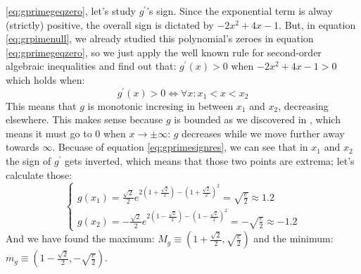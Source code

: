 \ref{eq:gprimegeqzero}, let's study $g^\prime$'s sign.
Since the exponential term is alway (strictly) positive, the overall sign is dictated
by $-2x^2 + 4x - 1$. But, in equation \ref{eq:grpimenull}, we already studied
this polynomial's zeroes in
equation \ref{eq:gprimegeqzero}, so we just apply the well known
rule
for second-order algebraic inequalities and find out that: $g^\prime(x) > 0$ when
$-2x^2 + 4x - 1 > 0$ which holds when:
\begin{equation}\label{eq:gprimesignres}
g^\prime(x) > 0 \iff \forall x: x_1 < x < x_2
\end{equation}
This means that $g$ is monotonic incresing in between $x_1$ and $x_2$, decreasing
elsewhere. This makes sense because $g$ is bounded as we discovered in
, which means it must go to $0$ when $x \to \pm\infty$:
$g$ decreases while we move further away towards $\infty$.
Becuase of equation \ref{eq:gprimesignres}, we can see that in $x_1$ and $x_2$ the sign
of $g^\prime$ gets inverted, which means that those two points are
extrema; let's calculate those:
\begin{equation*}
    \begin{cases}
        g(x_1) = \frac{\sqrt{2}}{2} e^{2\left( 1 + \frac{\sqrt{2}}{2} \right) - \left( 1 + \frac{\sqrt{2}}{2} \right)^2}
            = \sqrt{\frac{e}{2}} \approx 1.2\\
        g(x_2) = - \frac{\sqrt{2}}{2} e^{2\left( 1 - \frac{\sqrt{2}}{2} \right) - \left( 1 - \frac{\sqrt{2}}{2} \right)^2}
            = - \sqrt{\frac{e}{2}} \approx -1.2
    \end{cases}
\end{equation*}
And we have found the maximum: $M_g \equiv \left( 1 + \frac{\sqrt{2}}{2}, \sqrt{\frac{e}{2}} \right)$ and
the minimum: $m_g \equiv \left( 1 - \frac{\sqrt{2}}{2}, -\sqrt{\frac{e}{2}} \right)$.

